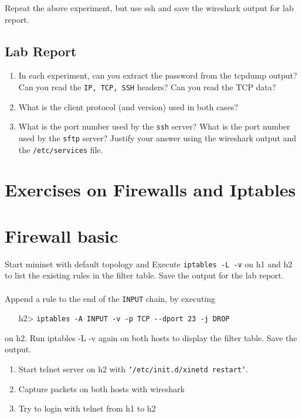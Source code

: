 \documentclass[10pt,a4paper]{article}
\numberwithin{equation}{section}
\numberwithin{figure}{section}
\numberwithin{table}{section}
\begin{document}
Repeat the above experiment, but use ssh and save the wireshark output for lab report.

\subsection*{Lab Report}
\begin{enumerate}
	\setlength{\itemindent}{0pt}
	\item In each experiment, can you extract the password from the tcpdump output? Can you read the \texttt{IP, TCP, SSH} headers? Can you read the TCP data?
	\item What is the client protocol (and version) used in both cases?
	\item What is the port number used by the \texttt{ssh} server? What is the port number used by the \texttt{sftp} server? Justify your answer using the wireshark output and the \texttt{/etc/services} file.
\end{enumerate}


\section*{Exercises on Firewalls and Iptables}
\section{Firewall basic}
Start mininet with default topology and Execute \texttt{iptables -L -v} on h1 and h2 to list the existing rules in the filter table. Save the output for the lab report.\\
\\
 Append a rule to the end of the \texttt{INPUT} chain, by executing

\begin{itemize}
	\setlength{\itemindent}{10pt}
	\item [h2>] \texttt{iptables -A INPUT -v -p TCP {-}{-}dport 23 -j DROP} 
\end{itemize}

\setlength{\parindent}{0pt}
on h2. Run iptables -L -v again on both hosts to display the filter table. Save the output.\\


\begin{enumerate}
	\setlength{\itemindent}{0pt}
	\item Start telnet server on h2 with \texttt{`/etc/init.d/xinetd restart`}.
	\item Capture packets on both hosts with wireshark
	\item Try to login with telnet from h1 to h2
\end{enumerate}
\end{document}
